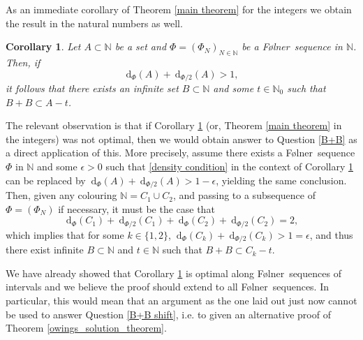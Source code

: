 \documentclass[reqno]{amsart}
\def\N{{\mathbb N}}
\newtheorem{corollary}[theorem]{Corollary}
\theoremstyle{definition}
\theoremstyle{remark}
\theoremstyle{remark}
\renewcommand{\d}{~\mathrm{d}}
\def\N{{\mathbb N}}
\newcommand{\Folner}{F\o{}lner}
\begin{document}
As an immediate corollary of Theorem \ref{main theorem} for 
the integers we obtain the result in the natural numbers as 
well. 

\begin{corollary} \label{B+B in density}
Let $A\subset \N$ be a set and $\Phi=(\Phi_N)_{N\in \N}$ be a \Folner\ sequence in $\N$. Then, if 
\begin{equation}\label{density condition}
\d_{\Phi}(A)+\d_{\Phi/2}(A)>1,
\end{equation}
it follows that there exists an infinite set $B\subset \N$ and some $t\in \N_0$ such that $B+B \subset A-t$.
\end{corollary}

The relevant observation is that if Corollary \ref{B+B in density} (or, Theorem \ref{main theorem} in the integers) was not optimal, then we 
would obtain answer to Question \ref{B+B} as a direct application of this. More precisely, assume 
there exists a \Folner\ sequence $\Phi$ in $\N$ and some $\epsilon>0$ such that 
\eqref{density condition} in the context of 
Corollary \ref{B+B in density} can be replaced by
$\d_{\Phi}(A)+\d_{\Phi/2}(A)>1-\epsilon$, yielding the same conclusion. 
Then, given any colouring $\N=C_1\cup C_2$, and passing to a subsequence of $\Phi=(\Phi_N)$ if necessary, it must be the 
case that 
$$\d_{\Phi}(C_1)+\d_{\Phi/2}(C_1)+\d_{\Phi}(C_2)+\d_{\Phi/2}(C_2) =2,$$
which implies that for some $k\in \{1,2\}$, $\d_{\Phi}(C_k)+\d_{\Phi/2}(C_k)>1=\epsilon$, and thus there exist infinite $B\subset \N$ and $t\in \N$ such that $B+B \subset C_k-t$.

We have already showed that Corollary \ref{B+B in density} is optimal along \Folner\ sequences of intervals and we believe the proof should extend to all \Folner\ sequences. In particular, this would mean that an argument as the one laid out just now cannot be used to answer Question \ref{B+B shift}, i.e. to given an alternative proof of Theorem \ref{owings_solution_theorem}. 








\vspace{1cm}
\end{document}
